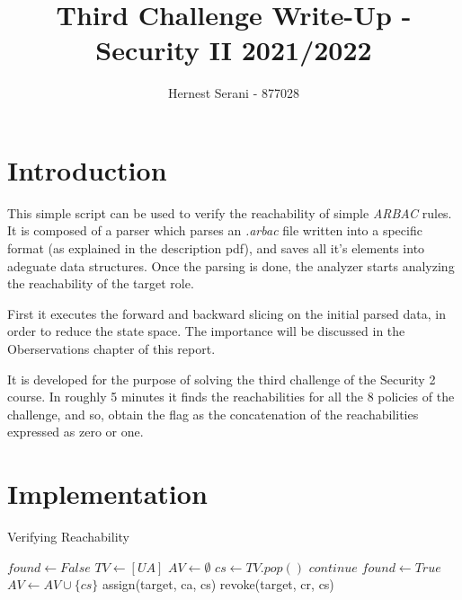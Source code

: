 \documentclass[12pt]{article}
\title{Third Challenge Write-Up - Security II 2021/2022}
\author{Hernest Serani - 877028}
\begin{document}
\maketitle

\part*{Introduction}
This simple script can be used to verify the reachability of simple {\it ARBAC} rules.
It is composed of a parser which parses an {\it .arbac} file written into a specific format (as explained
in the description pdf), and saves all it's elements into adeguate data structures.
Once the parsing is done, the analyzer starts analyzing the reachability of the target role.

First it executes the forward and backward slicing on the initial parsed data, in order to reduce the state space.
The importance will be discussed in the Oberservations chapter of this report.

It is developed for the purpose of solving the third challenge of the Security 2 course.
In roughly 5 minutes it finds the reachabilities for all the 8 policies of the challenge, and so,
obtain the flag as the concatenation of the reachabilities expressed as zero or one.

\part*{Implementation}

\begin{algorithm}
\caption{Verifying Reachability}\label{alg:cap}
\begin{algorithmic}
\State $found \gets False$
\State $TV \gets [UA]$ 
\State $AV \gets \emptyset$ 
    \State $ cs \gets TV.pop()$
     
        \State $continue$
    \EndIf
     
        \State $found \gets True$
    \EndIf
    \State $AV \gets AV \cup \{cs\}$
                \State assign(target, ca, cs) 
            \EndFor
        \EndFor
    \EndFor
                \State revoke(target, cr, cs) 
            \EndFor
        \EndFor
    \EndFor
\EndWhile
\end{algorithmic}
\end{algorithm}
\end{document}
